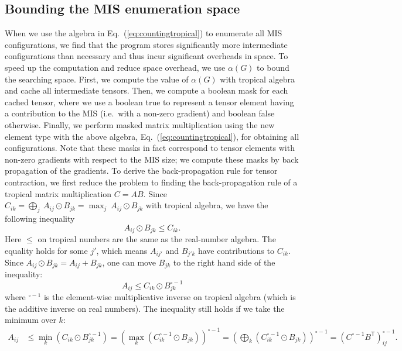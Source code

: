 \documentclass[onefignum, onetabnum]{siamart190516}
\newcommand{\<}{\langle}
\renewcommand{\>}{\rangle}
\newcommand{\Eq}[1]{Eq.~(\ref{#1})}
\begin{document}
\subsection{Bounding the MIS enumeration space}
When we use the algebra in \Eq{eq:countingtropical} to enumerate all MIS configurations, we find that the program stores significantly more intermediate configurations than necessary and thus incur significant overheads in space. To speed up the computation and reduce space overhead, we use $\alpha(G)$ to bound the searching space. First, we compute the value of $\alpha(G)$ with tropical algebra and cache all intermediate tensors. Then, we compute a boolean mask for each cached tensor, where we use a boolean true to represent a tensor element having a contribution to the MIS (i.e.\ with a non-zero gradient) and boolean false otherwise. Finally, we perform masked matrix multiplication using the new element type with the above algebra, \Eq{eq:countingtropical}, for obtaining all configurations. Note that these masks in fact correspond to tensor elements with non-zero gradients with respect to the MIS size; we compute these masks by back propagation of the gradients. To derive the back-propagation rule for tensor contraction, we first reduce the problem to finding the back-propagation rule of a tropical matrix multiplication $C = A B$. Since $ C_{ik} = \bigoplus_{j} \ A_{ij} \odot B_{jk} = \max_{j} \ A_{ij} \odot B_{jk}$ with tropical algebra, we have the following inequality
\begin{equation}
    A_{ij} \odot B_{jk} \leq C_{ik}.
\end{equation}
Here $\leq$ on tropical numbers are the same as the real-number algebra. The equality holds for some $j'$, which means $A_{ij'}$ and $B_{j'k}$ have contributions to $C_{ik}$. Since $A_{ij} \odot B_{jk} = A_{ij} + B_{jk}$, one can move $B_{jk}$ to the right hand side of the inequality: 
\begin{equation}
    A_{ij} \leq C_{ik} \odot B_{jk}^{\circ -1}
\end{equation}
where ${}^{\circ -1}$ is the element-wise multiplicative inverse on tropical algebra (which is the additive inverse on real numbers). The inequality still holds if we take the minimum over $k$: 
\begin{equation}
    \begin{split}
    A_{ij} &\leq \min_{k}(C_{ik} \odot B_{jk}^{\circ -1}) = \left(\max_{k} \left(C_{ik}^{\circ -1} \odot B_{jk} \right) \right)^{\circ -1} = \left(\bigoplus_{k} \left(C_{ik}^{\circ -1} \odot B_{jk} \right) \right)^{\circ -1} = \left( C^{\circ-1} B^{\mathsf{T}} \right)^{\circ -1}_{ij}.
    \end{split}
\end{equation}
\end{document}
